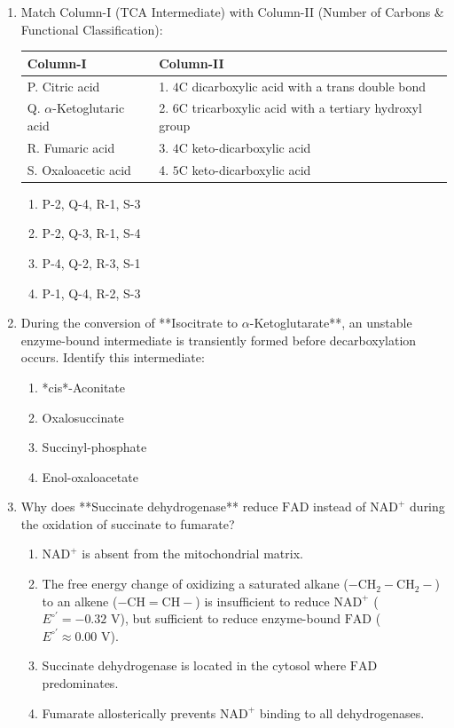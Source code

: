 \documentclass[11pt, a4paper]{article}
\begin{document}
\begin{enumerate}[label=\textbf{\arabic*.}]
\item Match Column-I (TCA Intermediate) with Column-II (Number of Carbons & Functional Classification):
\begin{center}
\begin{tabular}{|l|l|}
\hline
\textbf{Column-I} & \textbf{Column-II} \\
\hline
P. Citric acid & 1. $4\text{C}$ dicarboxylic acid with a trans double bond \\
Q. $\alpha$-Ketoglutaric acid & 2. $6\text{C}$ tricarboxylic acid with a tertiary hydroxyl group \\
R. Fumaric acid & 3. $4\text{C}$ keto-dicarboxylic acid \\
S. Oxaloacetic acid & 4. $5\text{C}$ keto-dicarboxylic acid \\
\hline
\end{tabular}
\end{center}
\begin{enumerate}[label=(\Alph*)]
    \item P-2, Q-4, R-1, S-3
    \item P-2, Q-3, R-1, S-4
    \item P-4, Q-2, R-3, S-1
    \item P-1, Q-4, R-2, S-3
\end{enumerate}

\item During the conversion of **Isocitrate to $\alpha$-Ketoglutarate**, an unstable enzyme-bound intermediate is transiently formed before decarboxylation occurs. Identify this intermediate:
\begin{enumerate}[label=(\Alph*)]
    \item *cis*-Aconitate
    \item Oxalosuccinate
    \item Succinyl-phosphate
    \item Enol-oxaloacetate
\end{enumerate}

\item Why does **Succinate dehydrogenase** reduce $\text{FAD}$ instead of $\text{NAD}^+$ during the oxidation of succinate to fumarate?
\begin{enumerate}[label=(\Alph*)]
    \item $\text{NAD}^+$ is absent from the mitochondrial matrix.
    \item The free energy change of oxidizing a saturated alkane ($-\text{CH}_2-\text{CH}_2-$) to an alkene ($-\text{CH}=\text{CH}-$) is insufficient to reduce $\text{NAD}^+$ ($E^{\circ\prime} = -0.32\text{ V}$), but sufficient to reduce enzyme-bound $\text{FAD}$ ($E^{\circ\prime} \approx 0.00\text{ V}$).
    \item Succinate dehydrogenase is located in the cytosol where $\text{FAD}$ predominates.
    \item Fumarate allosterically prevents $\text{NAD}^+$ binding to all dehydrogenases.
\end{enumerate}


\end{enumerate}
\end{document}

